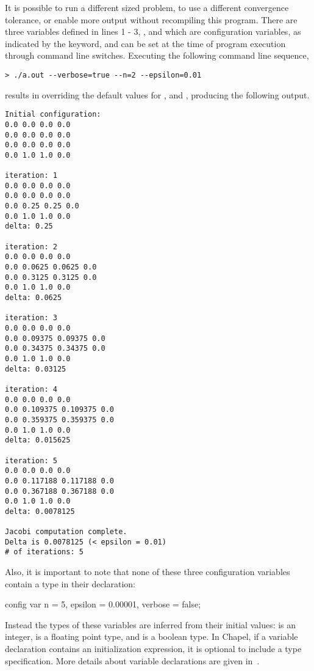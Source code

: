 It is possible to run a different sized problem, to use a different
convergence tolerance, or enable more output without recompiling this
program.  There are three variables defined in lines 1 - 3, 
,  and  which are configuration variables,
as indicated by the  keyword, 
and can be set at the time of program execution through command line switches.
Executing the following command line sequence,
\begin{verbatim}
> ./a.out --verbose=true --n=2 --epsilon=0.01
\end{verbatim}
results in overriding the default values for ,  and
, producing the following output.
\begin{verbatim}
Initial configuration:
0.0 0.0 0.0 0.0
0.0 0.0 0.0 0.0
0.0 0.0 0.0 0.0
0.0 1.0 1.0 0.0

iteration: 1
0.0 0.0 0.0 0.0
0.0 0.0 0.0 0.0
0.0 0.25 0.25 0.0
0.0 1.0 1.0 0.0
delta: 0.25

iteration: 2
0.0 0.0 0.0 0.0
0.0 0.0625 0.0625 0.0
0.0 0.3125 0.3125 0.0
0.0 1.0 1.0 0.0
delta: 0.0625

iteration: 3
0.0 0.0 0.0 0.0
0.0 0.09375 0.09375 0.0
0.0 0.34375 0.34375 0.0
0.0 1.0 1.0 0.0
delta: 0.03125

iteration: 4
0.0 0.0 0.0 0.0
0.0 0.109375 0.109375 0.0
0.0 0.359375 0.359375 0.0
0.0 1.0 1.0 0.0
delta: 0.015625

iteration: 5
0.0 0.0 0.0 0.0
0.0 0.117188 0.117188 0.0
0.0 0.367188 0.367188 0.0
0.0 1.0 1.0 0.0
delta: 0.0078125

Jacobi computation complete.
Delta is 0.0078125 (< epsilon = 0.01)
# of iterations: 5
\end{verbatim}

Also, it is important to note that none of these three configuration variables contain a 
type in their declaration: 
\begin{chapel}
config var n = 5,
           epsilon = 0.00001,
           verbose = false;
\end{chapel}
Instead the types of these variables are inferred 
from their initial values:  is an integer,  is a floating point
type, and  is a boolean type.  In Chapel, if a variable declaration
contains an initialization expression, it is optional to include a type specification.
More details about variable declarations are given in~.

